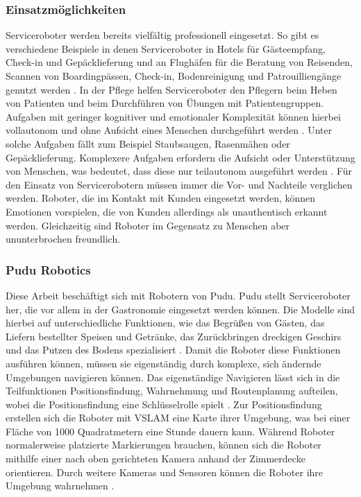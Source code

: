 \subsubsection{Einsatzmöglichkeiten}
Serviceroboter werden bereits vielfältig professionell eingesetzt. So gibt es verschiedene Beispiele in denen Serviceroboter in Hotels für Gästeempfang, Check-in und Gepäcklieferung und an Flughäfen für die Beratung von Reisenden, Scannen von Boardingpässen, Check-in, Bodenreinigung und Patrouilliengänge genutzt werden \cite[S.~425]{Paluch2020}. In der Pflege helfen Serviceroboter den Pflegern beim Heben von Patienten und beim Durchführen von Übungen mit Patientengruppen\cite[S.~427]{Paluch2020}. Aufgaben mit geringer kognitiver und emotionaler Komplexität können hierbei vollautonom und ohne Aufsicht eines Menschen durchgeführt werden \cite[S.~429]{Paluch2020}. Unter solche Aufgaben fällt zum Beispiel Staubsaugen, Rasenmähen oder Gepäcklieferung. Komplexere Aufgaben erfordern die Aufsicht oder Unterstützung von Menschen, was bedeutet, dass diese nur teilautonom ausgeführt werden \cite[S.~430-431]{Paluch2020}. Für den Einsatz von Servicerobotern müssen immer die Vor- und Nachteile verglichen werden. Roboter, die im Kontakt mit Kunden eingesetzt werden, können Emotionen vorspielen, die von Kunden allerdings als unauthentisch erkannt werden. Gleichzeitig sind Roboter im Gegensatz zu Menschen aber ununterbrochen freundlich.\cite[S.~427]{Paluch2020}

\subsubsection{Pudu Robotics}
Diese Arbeit beschäftigt sich mit Robotern von Pudu. Pudu stellt Serviceroboter her, die vor allem in der Gastronomie eingesetzt werden können. Die Modelle sind hierbei auf unterschiedliche Funktionen, wie das Begrüßen von Gästen, das Liefern bestellter Speisen und Getränke, das Zurückbringen dreckigen Geschirs und das Putzen des Bodens spezialisiert \cite{PUDU2024}. Damit die Roboter diese Funktionen ausführen können, müssen sie eigenständig durch komplexe, sich ändernde Umgebungen navigieren können. Das eigenständige Navigieren lässt sich in die Teilfunktionen Positionsfindung, Wahrnehmung und Routenplanung aufteilen, wobei die Positionsfindung eine Schlüsselrolle spielt \cite{Nature2022}. Zur Positionsfindung erstellen sich die Roboter mit \ac{VSLAM} eine Karte ihrer Umgebung, was bei einer Fläche von 1000 Quadratmetern eine Stunde dauern kann. Während Roboter normalerweise platzierte Markierungen brauchen, können sich die Roboter mithilfe einer nach oben gerichteten Kamera anhand der Zimmerdecke orientieren.\cite{Pudu2023} Durch weitere Kameras und Sensoren können die Roboter ihre Umgebung wahrnehmen \cite{Nature2022}.


